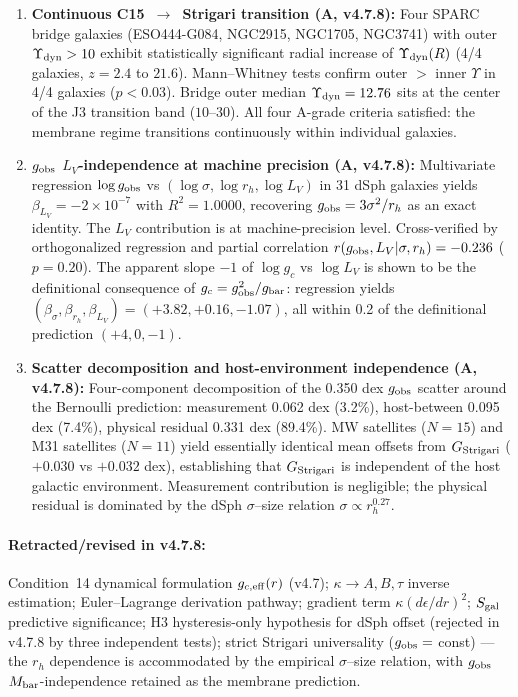 \documentclass[11pt,a4paper]{article}
\newcommand{\e}[1]{\times 10^{#1}}
\newcommand{\gobs}{g_{\rm obs}}
\newcommand{\gbar}{g_{\rm bar}}
\newcommand{\gc}{g_{c}}
\newcommand{\Ydyn}{\Upsilon_{\rm dyn}}
\newcommand{\rh}{r_{h}}
\newcommand{\LV}{L_{V}}
\newcommand{\kap}{\kappa}
\newcommand{\Mbar}{M_{\rm bar}}
\newcommand{\Sgal}{S_{\rm gal}}
\newcommand{\Gstr}{G_{\rm Strigari}}
\begin{document}
\begin{enumerate}[leftmargin=*,itemsep=4pt,label=\textbf{\arabic*.}]
\item \textbf{Continuous C15~$\to$~Strigari transition (A, v4.7.8):} Four SPARC bridge galaxies
(ESO444-G084, NGC2915, NGC1705, NGC3741) with outer $\Ydyn > 10$ exhibit statistically significant radial
increase of $\Ydyn(R)$ (4/4 galaxies, $z = 2.4$ to $21.6$). Mann--Whitney tests confirm outer $>$ inner
$\Upsilon$ in 4/4 galaxies ($p < 0.03$). Bridge outer median $\Ydyn = 12.76$ sits at the center of the J3
transition band ($10\text{--}30$). All four A-grade criteria satisfied: the membrane regime transitions
continuously within individual galaxies.

\item \textbf{$\gobs$ $\LV$-independence at machine precision (A, v4.7.8):} Multivariate regression
$\log\gobs$ vs $(\log\sigma, \log\rh, \log\LV)$ in 31 dSph galaxies yields $\beta_{\LV} = -2\e{-7}$ with
$R^2 = 1.0000$, recovering $\gobs = 3\sigma^2/\rh$ as an exact identity. The $\LV$ contribution is at
machine-precision level. Cross-verified by orthogonalized regression and partial correlation
$r(\gobs, \LV | \sigma, \rh) = -0.236$ ($p = 0.20$). The apparent slope $-1$ of $\log\gc$ vs $\log\LV$ is
shown to be the definitional consequence of $\gc = \gobs^2/\gbar$: regression yields
$(\beta_\sigma, \beta_{\rh}, \beta_{\LV}) = (+3.82, +0.16, -1.07)$, all within 0.2 of the definitional
prediction $(+4, 0, -1)$.

\item \textbf{Scatter decomposition and host-environment independence (A, v4.7.8):} Four-component
decomposition of the 0.350 dex $\gobs$ scatter around the Bernoulli prediction: measurement 0.062 dex
(3.2\%), host-between 0.095 dex (7.4\%), physical residual 0.331 dex (89.4\%). MW satellites ($N = 15$) and
M31 satellites ($N = 11$) yield essentially identical mean offsets from $\Gstr$ ($+0.030$ vs $+0.032$ dex),
establishing that $\Gstr$ is independent of the host galactic environment. Measurement contribution is
negligible; the physical residual is dominated by the dSph $\sigma$--size relation $\sigma \propto
\rh^{0.27}$.
\end{enumerate}

\paragraph{Retracted/revised in v4.7.8:}
Condition~14 dynamical formulation $g_{c,\rm eff}(r)$ (v4.7); $\kap \to A, B, \tau$ inverse estimation;
Euler--Lagrange derivation pathway; gradient term $\kap(d\epsilon/dr)^2$; $\Sgal$ predictive significance;
H3 hysteresis-only hypothesis for dSph offset (rejected in v4.7.8 by three independent tests); strict
Strigari universality ($\gobs = $ const) --- the $\rh$ dependence is accommodated by the empirical
$\sigma$--size relation, with $\gobs$ $\Mbar$-independence retained as the membrane prediction.
\end{document}
